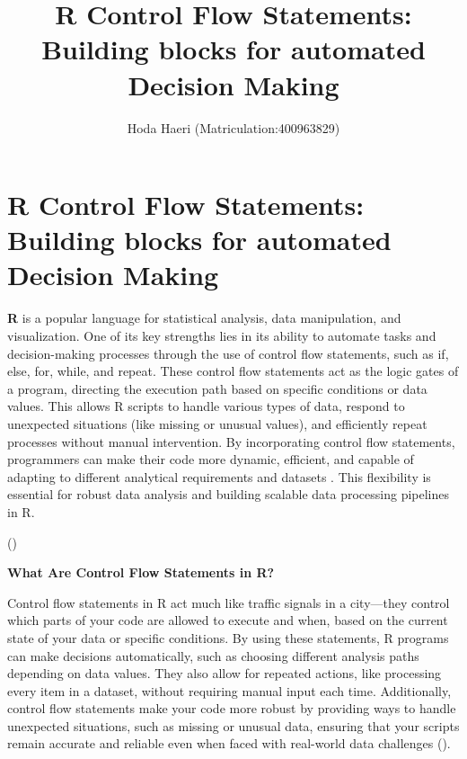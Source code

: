 \documentclass[
  man,
  floatsintext,
  longtable,
  nolmodern,
  notxfonts,
  notimes,
  colorlinks=true,linkcolor=blue,citecolor=blue,urlcolor=blue]{apa7}
\title{R Control Flow Statements: Building blocks for automated Decision
Making}
\author{Hoda Haeri (Matriculation:400963829)}
\affiliation{
{Hochschule Fresenius - University of Applied Science}}
\begin{document}
\maketitle

\hypertarget{toc}{}
\tableofcontents
\newpage
\section[Introduction]{R Control Flow Statements: Building blocks for
automated Decision Making}

\setcounter{secnumdepth}{-\maxdimen} %

\setlength\LTleft{0pt}


\textbf{R} is a popular language for statistical analysis, data
manipulation, and visualization. One of its key strengths lies in its
ability to automate tasks and decision-making processes through the use
of control flow statements, such as if, else, for, while, and repeat.
These control flow statements act as the logic gates of a program,
directing the execution path based on specific conditions or data
values. This allows R scripts to handle various types of data, respond
to unexpected situations (like missing or unusual values), and
efficiently repeat processes without manual intervention. By
incorporating control flow statements, programmers can make their code
more dynamic, efficient, and capable of adapting to different analytical
requirements and datasets . This flexibility is essential for robust
data analysis and building scalable data processing pipelines in R.

()

\textbf{What Are Control Flow Statements in R?}

Control flow statements in R act much like traffic signals in a
city---they control which parts of your code are allowed to execute and
when, based on the current state of your data or specific conditions. By
using these statements, R programs can make decisions automatically,
such as choosing different analysis paths depending on data values. They
also allow for repeated actions, like processing every item in a
dataset, without requiring manual input each time. Additionally, control
flow statements make your code more robust by providing ways to handle
unexpected situations, such as missing or unusual data, ensuring that
your scripts remain accurate and reliable even when faced with
real-world data challenges ().
\end{document}
